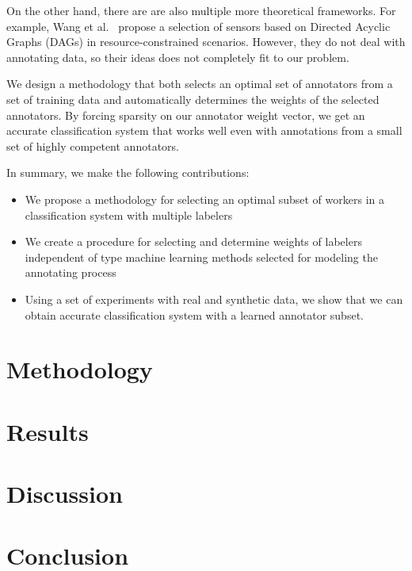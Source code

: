 \documentclass{llncs}
\begin{document}
On the other hand, there are are also multiple more theoretical frameworks. For example, Wang et al.~\cite{} propose a selection of sensors based on Directed Acyclic Graphs (DAGs) in resource-constrained scenarios. However, they do not deal with annotating data, so their ideas does not completely fit to our problem. 

We design a methodology that both selects an optimal set of annotators from a set of training data and automatically determines the weights of the selected annotators. By forcing sparsity on our annotator weight vector, we get an accurate classification system that works well even with annotations from a small set of highly competent annotators.

In summary, we make the following contributions:
\begin{itemize}
\item We propose a methodology for selecting an optimal subset of workers in a classification system with multiple labelers
\item We create a procedure for selecting and determine weights of labelers independent of type machine learning methods selected for modeling the annotating process
\item Using a set of experiments with real and synthetic data, we show that we can obtain accurate classification system with a learned annotator subset.
\end{itemize}  


\section{Methodology}

\section{Results}

\section{Discussion}


\section{Conclusion}






%

%
\end{document}
